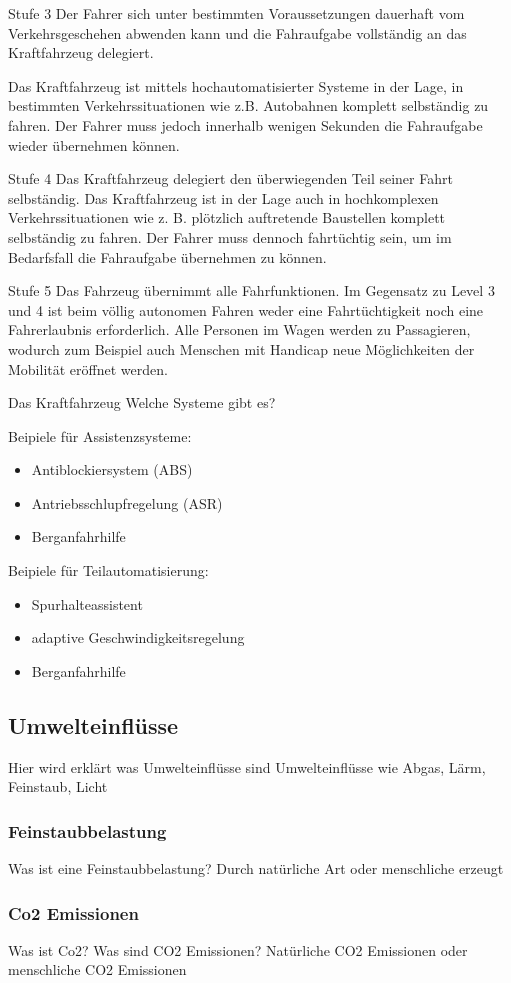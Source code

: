 Stufe 3
Der Fahrer sich unter bestimmten Voraussetzungen dauerhaft vom Verkehrsgeschehen abwenden kann und die Fahraufgabe vollständig an das Kraftfahrzeug delegiert.

Das Kraftfahrzeug ist mittels hochautomatisierter Systeme in der Lage, in bestimmten Verkehrssituationen wie z.B. Autobahnen komplett selbständig zu fahren.
Der Fahrer muss jedoch innerhalb wenigen Sekunden die Fahraufgabe wieder übernehmen können.


Stufe 4
Das Kraftfahrzeug delegiert den überwiegenden Teil seiner Fahrt selbständig.
Das Kraftfahrzeug ist in der Lage auch in hochkomplexen Verkehrssituationen wie z. B. plötzlich auftretende Baustellen komplett selbständig zu fahren.
Der Fahrer muss dennoch fahrtüchtig sein, um im Bedarfsfall die Fahraufgabe übernehmen zu können.

Stufe 5
Das Fahrzeug übernimmt alle Fahrfunktionen.
Im Gegensatz zu Level 3 und 4 ist beim völlig autonomen Fahren weder eine Fahrtüchtigkeit noch eine Fahrerlaubnis erforderlich.
Alle Personen im Wagen werden zu Passagieren, wodurch zum Beispiel auch Menschen mit Handicap neue Möglichkeiten der Mobilität eröffnet werden.



Das Kraftfahrzeug
Welche Systeme gibt es?

Beipiele für Assistenzsysteme:
\begin{itemize}
	\item Antiblockiersystem (ABS)
	\item Antriebsschlupfregelung (ASR)
	\item Berganfahrhilfe
\end{itemize}

Beipiele für Teilautomatisierung:
\begin{itemize}
	\item Spurhalteassistent
	\item adaptive Geschwindigkeitsregelung
	\item Berganfahrhilfe
\end{itemize}

\subsection{Umwelteinflüsse}

Hier wird erklärt was Umwelteinflüsse sind
Umwelteinflüsse wie Abgas, Lärm, Feinstaub, Licht

\subsubsection{Feinstaubbelastung}
Was ist eine Feinstaubbelastung?
Durch natürliche Art oder menschliche erzeugt
\subsubsection{Co2 Emissionen}
Was ist Co2?
Was sind CO2 Emissionen?
Natürliche CO2 Emissionen oder menschliche CO2 Emissionen
